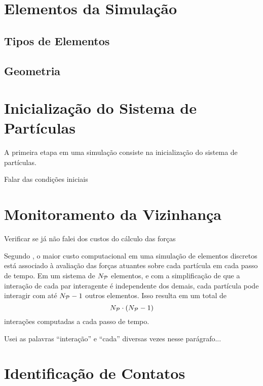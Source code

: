\section{Elementos da Simulação}

\subsection{Tipos de Elementos}
\subsection{Geometria}

\section{Inicialização do Sistema de Partículas}

A primeira etapa em uma simulação \DEM{} consiste na inicialização do sistema de partículas.

\alert{Falar das condições iniciais}

\section{Monitoramento da Vizinhança} \label{sec:neighborhood}

\alert{Verificar se já não falei dos custos do cálculo das forças}

Segundo , o maior custo computacional em uma simulação de elementos discretos está associado à avaliação das forças atuantes sobre cada partícula em cada passo de tempo. Em um sistema de \(N_{\mathcal{P}}\) elementos, e com a simplificação de que a interação de cada par interagente é independente dos demais, cada partícula pode interagir com até \(N_{\mathcal{P}}-1\) outros elementos. Isso resulta em um total de
\begin{equation*}
	\numberOfParticles\cdot\pqty{\numberOfParticles-1}
\end{equation*}
interações computadas a cada passo de tempo.

\alert{Usei as palavras ``interação'' e ``cada'' diversas vezes nesse parágrafo...}



\section{Identificação de Contatos}

